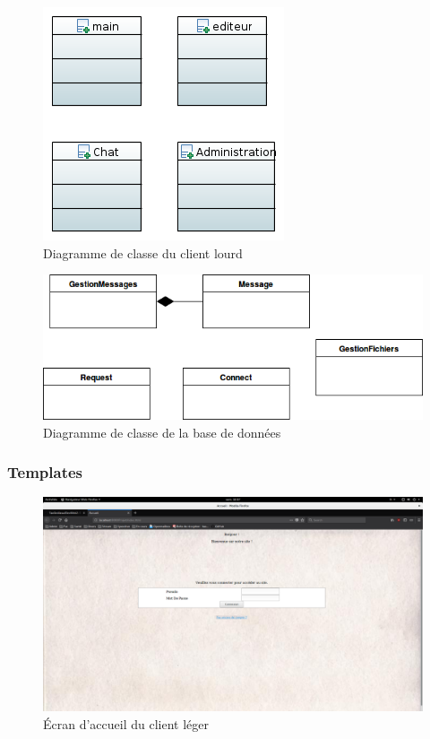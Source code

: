 \documentclass[a4paper, 12pt]{article}
\begin{document}
\begin{figure}[H]
  \begin{center}
    \includegraphics{DiagrammeClientLourd.PNG}
  \end{center}
  \caption{Diagramme de classe du client lourd}
\end{figure}

\begin{figure}[H]
  \begin{center}
    \includegraphics[scale=0.7]{DiagrammeBDD.png}
  \end{center}
  \caption{Diagramme de classe de la base de données}
\end{figure}



\subsubsection{Templates}

\begin{figure}[H]
  \begin{center}
    \includegraphics[scale=0.2]{accueil_leger.png}
  \end{center}
  \caption{Écran d'accueil du client léger}
\end{figure}
\end{document}
